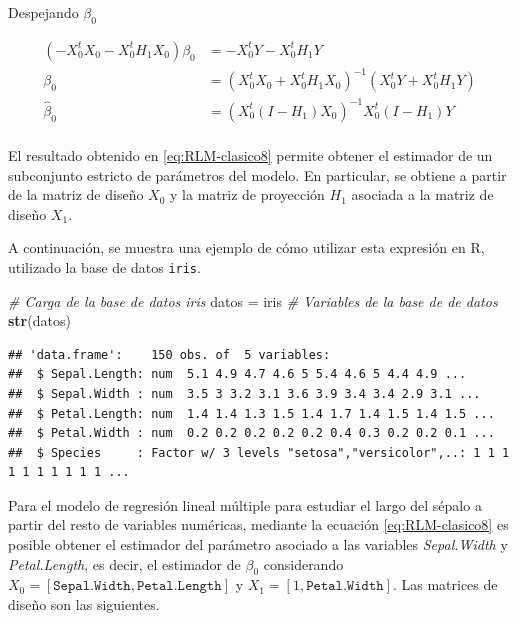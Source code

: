 \documentclass[
  11pt,
]{book}
\newenvironment{Shaded}{\begin{snugshade}}{\end{snugshade}}
\newcommand{\CommentTok}[1]{\textcolor[rgb]{0.56,0.35,0.01}{\textit{#1}}}
\newcommand{\FunctionTok}[1]{\textcolor[rgb]{0.13,0.29,0.53}{\textbf{#1}}}
\newcommand{\NormalTok}[1]{#1}
\newcommand{\OtherTok}[1]{\textcolor[rgb]{0.56,0.35,0.01}{#1}}
\theoremstyle{definition}
\theoremstyle{definition}
\theoremstyle{definition}
\theoremstyle{definition}
\theoremstyle{remark}
\begin{document}
Despejando \(\beta_0\)

\begin{equation}
\begin{split}
(-X^t_0X_0-X^t_0H_1X_0)\beta_0 &= -X^t_0Y - X^t_0H_1Y\\
\beta_0 &= (X^t_0X_0 + X^t_0H_1X_0)^{-1}(X^t_0Y + X^t_0H_1Y)\\
\widehat{\beta}_0 &= (X^t_0(I-H_1)X_0)^{-1}X^t_0(I-H_1)Y\\
\end{split}
\label{eq:RLM-clasico8}
\end{equation}

El resultado obtenido en \eqref{eq:RLM-clasico8} permite obtener el estimador de un subconjunto estricto de parámetros del modelo. En particular, se obtiene a partir de la matriz de diseño \(X_0\) y la matriz de proyección \(H_1\) asociada a la matriz de diseño \(X_1\).

A continuación, se muestra una ejemplo de cómo utilizar esta expresión en R, utilizado la base de datos \texttt{iris}.

\begin{Shaded}
\begin{Highlighting}[]
\CommentTok{\# Carga de la base de datos iris}
\NormalTok{datos }\OtherTok{=}\NormalTok{ iris}
\CommentTok{\# Variables de la base de de datos}
\FunctionTok{str}\NormalTok{(datos)}
\end{Highlighting}
\end{Shaded}

\begin{verbatim}
## 'data.frame':    150 obs. of  5 variables:
##  $ Sepal.Length: num  5.1 4.9 4.7 4.6 5 5.4 4.6 5 4.4 4.9 ...
##  $ Sepal.Width : num  3.5 3 3.2 3.1 3.6 3.9 3.4 3.4 2.9 3.1 ...
##  $ Petal.Length: num  1.4 1.4 1.3 1.5 1.4 1.7 1.4 1.5 1.4 1.5 ...
##  $ Petal.Width : num  0.2 0.2 0.2 0.2 0.2 0.4 0.3 0.2 0.2 0.1 ...
##  $ Species     : Factor w/ 3 levels "setosa","versicolor",..: 1 1 1 1 1 1 1 1 1 1 ...
\end{verbatim}

Para el modelo de regresión lineal múltiple para estudiar el largo del sépalo a partir del resto de variables numéricas, mediante la ecuación \eqref{eq:RLM-clasico8} es posible obtener el estimador del parámetro asociado a las variables \emph{Sepal.Width} y \emph{Petal.Length}, es decir, el estimador de \(\beta_0\) considerando \(X_0 = [\texttt{Sepal.Width}, \texttt{Petal.Length}]\) y \(X_1 = [1, \texttt{Petal.Width}]\). Las matrices de diseño son las siguientes.
\end{document}
